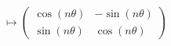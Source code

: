 \documentclass[12pt]{article}
\begin{document}
\begin{enumerate}
          \[
              \mapsto \left(\begin{array}{cc}
                      \cos (n \theta) & -\sin (n \theta) \\
                      \sin (n \theta) & \cos (n \theta)
                  \end{array}\right)
          \]

\end{enumerate}

\newpage



\nocite{El-Deeb_PEU-323_Assignments}
\end{document}
